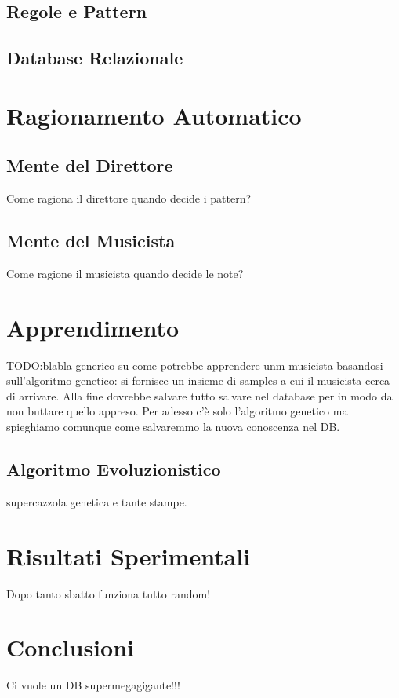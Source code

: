 \documentclass[a4paper,10pt]{article}
\begin{document}
\subsection{Regole e Pattern}
\subsection{Database Relazionale}

\section{Ragionamento Automatico}
\subsection{Mente del Direttore}
Come ragiona il direttore quando decide i pattern?
\subsection{Mente del Musicista}
Come ragione il musicista quando decide le note?

\section{Apprendimento}
TODO:blabla generico su come potrebbe apprendere unm musicista basandosi sull'algoritmo genetico:
si fornisce un insieme di samples a cui il musicista cerca di arrivare. 
Alla fine dovrebbe salvare tutto salvare nel database per in modo da non buttare quello appreso.
Per adesso c'è solo l'algoritmo genetico ma spieghiamo comunque come salvaremmo la nuova conoscenza nel DB.  
\subsection{Algoritmo Evoluzionistico}
supercazzola genetica e tante stampe.

\section{Risultati Sperimentali}
Dopo tanto sbatto funziona tutto random!

\section{Conclusioni}
Ci vuole un DB supermegagigante!!!
\end{document}
